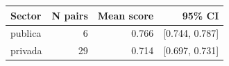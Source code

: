 \begin{tabular}{lrrr}
\hline
Sector & N pairs & Mean score & 95\% CI \\
\hline
publica & 6 & 0.766 & [0.744, 0.787] \\
privada & 29 & 0.714 & [0.697, 0.731] \\
\hline
\end{tabular}
